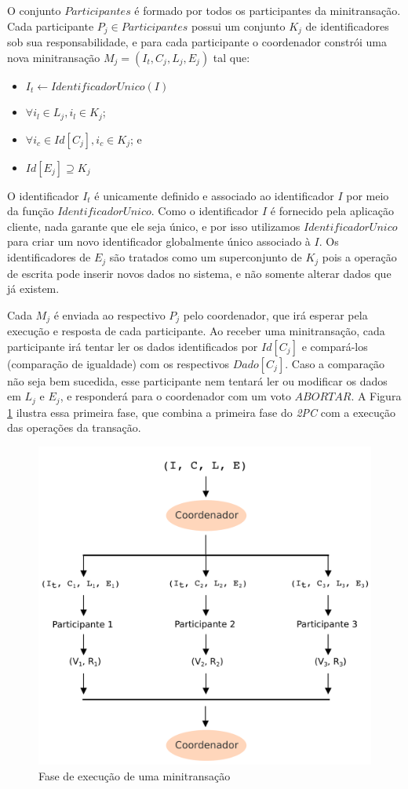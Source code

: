 \documentclass[11pt,twoside,a4paper]{book}
\begin{document}
O conjunto $Participantes$ é formado por todos os participantes da minitransação. Cada participante $P_j \in Participantes$ possui um conjunto $K_j$ de identificadores sob sua responsabilidade, e para cada participante o coordenador constrói uma nova minitransação \(M_j = (I_t, C_j, L_j, E_j)\) tal que:

\begin{itemize}
    \item $I_t \gets IdentificadorUnico(I)$
    \item $\forall i_l \in L_j, i_l \in K_j$;
    \item $\forall i_c \in Id[C_j], i_c \in K_j$; e
    \item $Id[E_j] \supseteq K_j$
\end{itemize}

O identificador $I_t$ é unicamente definido e associado ao identificador $I$ por meio da função $IdentificadorUnico$. Como o identificador $I$ é fornecido pela aplicação cliente, nada garante que ele seja único, e por isso utilizamos $IdentificadorUnico$ para criar um novo identificador globalmente único associado à $I$. Os identificadores de $E_j$ são tratados como um superconjunto de $K_j$ pois a operação de escrita pode inserir novos dados no sistema, e não somente alterar dados que já existem.

Cada $M_j$ é enviada ao respectivo $P_j$ pelo coordenador, que irá esperar pela execução e resposta de cada participante. Ao receber uma minitransação, cada participante irá tentar ler os dados identificados por $Id[C_j]$ e compará-los (comparação de igualdade) com os respectivos $Dado[C_j]$. Caso a comparação não seja bem sucedida, esse participante nem tentará ler ou modificar os dados em $L_j$ e $E_j$, e responderá para o coordenador com um voto $ABORTAR$. A Figura \ref{fig:minitransacao_1fase} ilustra essa primeira fase, que combina a primeira fase do \emph{2PC} com a execução das operações da transação.

\begin{figure}
  \centering
  \includegraphics[width=.65\textwidth]{minitransacao_1fase} 
  \caption{Fase de execução de uma minitransação}
  \label{fig:minitransacao_1fase} 
\end{figure}
\end{document}
